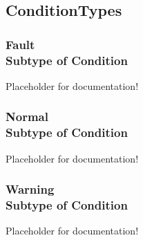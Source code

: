 \subsection{ConditionTypes} \label{model:ConditionTypes}
\subsubsection[Fault]{Fault \\ {\small Subtype of Condition}}
  \label{type:Fault}

\FloatBarrier

Placeholder for documentation!

\FloatBarrier
\subsubsection[Normal]{Normal \\ {\small Subtype of Condition}}
  \label{type:Normal}

\FloatBarrier

Placeholder for documentation!

\FloatBarrier
\subsubsection[Warning]{Warning \\ {\small Subtype of Condition}}
  \label{type:Warning}

\FloatBarrier

Placeholder for documentation!

\FloatBarrier
